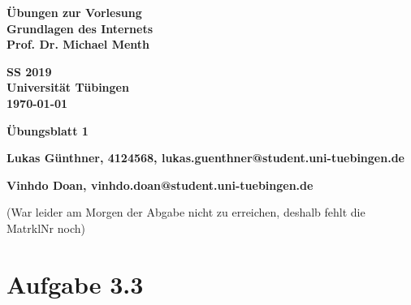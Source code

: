 \documentclass[a4paper,url]{article}
\begin{document}
\newcommand{\nat}{\mbox{I}\!\mbox{N}}

\newcommand{\real}{\mbox{I}\!\mbox{R}}

\setcounter{aufgabe_count}{1}
\newcommand{\aufgabe}[2]{\vspace{3.5ex} {\noindent \bf\large Aufgabe
\arabic{aufgabe_count}: \hspace{10pt}#1} \hspace{5pt}(#2 Punkte)\vspace{3pt}\\ 
\stepcounter{aufgabe_count} 
}


\baselineskip

\pagestyle{plain}

\noindent
\begin{minipage}[t]{0.6\textwidth}
\begin{flushleft}
\bf Übungen zur Vorlesung\\
Grundlagen des Internets\\
Prof. Dr. Michael Menth
\end{flushleft}
\end{minipage}
\begin{minipage}[t]{0.4\textwidth}
\begin{flushright}
\bf SS 2019\\
Universität Tübingen\\
\today %
\end{flushright}
\end{minipage}



\vspace{5.0ex}
\noindent

\centerline{\huge \bf Übungsblatt 1}
\centerline{\bf Lukas Günthner, 4124568, lukas.guenthner@student.uni-tuebingen.de}
\centerline{\bf Vinhdo Doan, vinhdo.doan@student.uni-tuebingen.de}
	\centerline{(War leider am Morgen der Abgabe nicht zu erreichen, deshalb fehlt die MatrklNr noch)}
\section*{Aufgabe 3.3}
\end{document}
